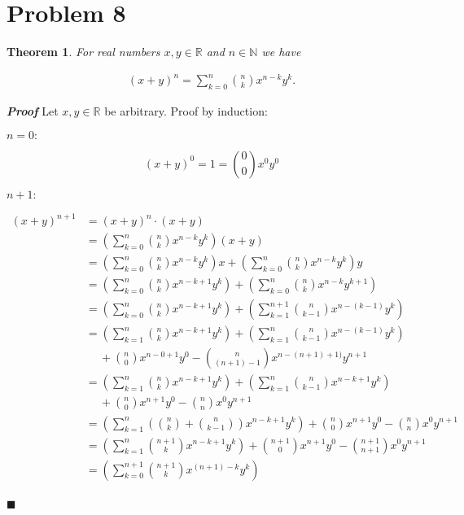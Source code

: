 \documentclass[]{article}
\newtheorem{theorem}{Theorem}
\newenvironment{proof}{\textit{\textbf{Proof}}}{\hfill$\blacksquare$}
\begin{document}
\section*{Problem 8}

\begin{theorem}
	For real numbers $x, y \in \mathbb{R}$ and $n \in \mathbb{N}$ we have
	
	\begin{align*}
		(x+y)^n = \sum_{k=0}^{n} \binom{n}{k} x^{n-k} y^k.
	\end{align*}
\end{theorem}

\begin{proof}
	Let $x, y \in \mathbb{R}$ be arbitrary. Proof by induction:
	
	\noindent$n = 0:$
	
	\[(x+y)^0 = 1 = \binom{0}{0} x^0 y^0\]
	
	\noindent$n+1:$
	
	\begin{align*}
		(x+y)^{n+1} &= (x+y)^n \cdot (x+y) \\
		&= \left( \sum_{k=0}^{n} \binom{n}{k} x^{n-k} y^k \right) (x+y) \\
		&= \left( \sum_{k=0}^{n} \binom{n}{k} x^{n-k} y^k \right)x +
		   \left( \sum_{k=0}^{n} \binom{n}{k} x^{n-k} y^k \right)y \\
		&= \left( \sum_{k=0}^{n} \binom{n}{k} x^{n-k+1} y^k \right) +
		   \left( \sum_{k=0}^{n} \binom{n}{k} x^{n-k} y^{k+1} \right) \\
		&= \left( \sum_{k=0}^{n} \binom{n}{k} x^{n-k+1} y^k \right) +
		   \left( \sum_{k=1}^{n+1} \binom{n}{k-1} x^{n-(k-1)} y^{k} \right) \\
		&= \left( \sum_{k=1}^{n} \binom{n}{k} x^{n-k+1} y^{k} \right) +
		   \left( \sum_{k=1}^{n} \binom{n}{k-1} x^{n-(k-1)} y^{k} \right) \\
		   &\ \quad + \binom{n}{0} x^{n-0+1} y^0 - \binom{n}{(n+1)-1} x^{n-(n+1)+1)} y^{n+1} \\
		&= \left( \sum_{k=1}^{n} \binom{n}{k} x^{n-k+1} y^{k} \right) +
		   \left( \sum_{k=1}^{n} \binom{n}{k-1} x^{n-k+1} y^{k} \right) \\
		   &\ \quad + \binom{n}{0} x^{n+1} y^0 - \binom{n}{n} x^{0} y^{n+1} \\
		&= \left( \sum_{k=1}^{n} \left(\binom{n}{k} + \binom{n}{k-1}\right) x^{n-k+1} y^{k} \right) + \binom{n}{0} x^{n+1} y^0 - \binom{n}{n} x^{0} y^{n+1} \\
		&= \left( \sum_{k=1}^{n} \binom{n+1}{k} x^{n-k+1} y^{k} \right) + \binom{n+1}{0} x^{n+1} y^0 - \binom{n+1}{n+1} x^{0} y^{n+1} \\
		&= \left( \sum_{k=0}^{n+1} \binom{n+1}{k} x^{(n+1)-k} y^{k} \right) \\
	\end{align*} 

\end{proof}
\end{document}
